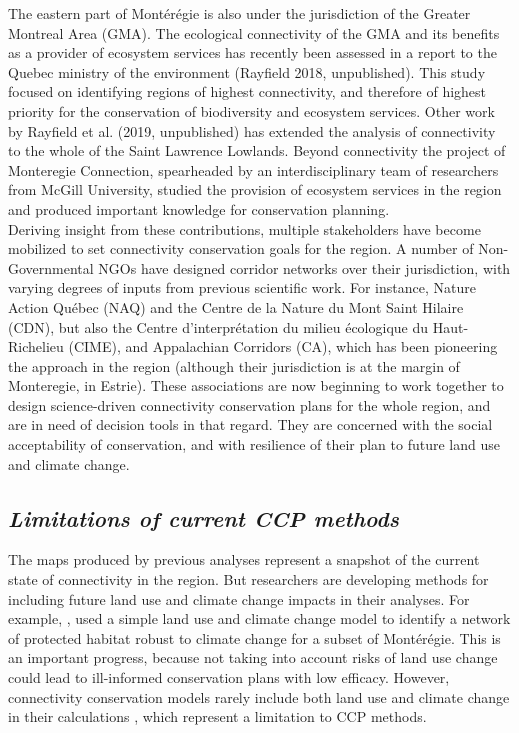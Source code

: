 \documentclass[12pt,Bold,TexShade]{thesis/mcgilletdclass}
\begin{document}
{The eastern part of Montérégie is also under the jurisdiction of the Greater Montreal Area (GMA). The ecological connectivity of the GMA and its benefits as a provider of ecosystem services has recently been assessed in a report to the Quebec ministry of the environment (Rayfield 2018, unpublished). This study focused on identifying regions of highest connectivity, and therefore of highest priority for the conservation of biodiversity and ecosystem services. Other work by Rayfield et al. (2019, unpublished) has extended the analysis of connectivity to the whole of the Saint Lawrence Lowlands. Beyond connectivity the project of Monteregie Connection, spearheaded by an interdisciplinary team of researchers from McGill University, studied the provision of ecosystem services in the region and produced important knowledge for conservation planning. \\

Deriving insight from these contributions, multiple stakeholders have become mobilized to set connectivity conservation goals for the region. A number of Non-Governmental NGOs have designed corridor networks over their jurisdiction, with varying degrees of inputs from previous scientific work. For instance, Nature Action Québec (NAQ) and the Centre de la Nature du Mont Saint Hilaire (CDN), but also the Centre d'interprétation du milieu écologique du Haut-Richelieu (CIME), and Appalachian Corridors (CA), which has been pioneering the approach in the region (although their jurisdiction is at the margin of Monteregie, in Estrie). These associations are now beginning to work together to design science-driven connectivity conservation plans for the whole region, and are in need of decision tools in that regard. They are concerned with the social acceptability of conservation, and with resilience of their plan to future land use and climate change. \\ \vspace{2em}

\subsection*{\textit{Limitations of current CCP methods \\ \vspace{1em}}}

The maps produced by previous analyses represent a snapshot of the current state of connectivity in the region. But researchers are developing methods for including future land use and climate change impacts in their analyses. For example, \cite{albert_applying_2017}, used a simple land use and climate change model  to identify a network of protected habitat robust to climate change for a subset of Montérégie. This is an important progress, because not taking into account risks of land use change could lead to ill-informed conservation plans with low efficacy. However, connectivity conservation models rarely include both land use and climate change in their calculations \citep{costanza_landscape_2019}, which represent a limitation to CCP methods. \\

}
\end{document}
